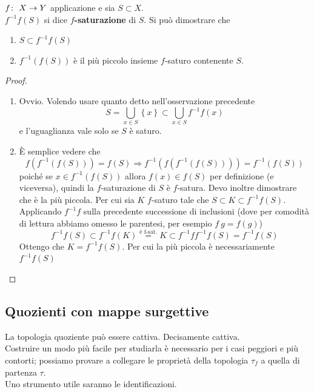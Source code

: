 \begin{theorem}
	$f \colon\ X \rightarrow Y$ applicazione e sia $S \subset X$. \\ $f^{-1}f(S)$ si dice \textbf{$f$-saturazione} di $S$. Si può dimostrare che 
	\begin{enumerate}
		\item $S \subset f^{-1}f(S)$
		\item $f^{-1}\left(f(S)\right)$ è il più piccolo insieme $f$-saturo contenente $S$.
	\end{enumerate}
\end{theorem}
\begin{proof}\
	\begin{enumerate}
		\item Ovvio. Volendo usare quanto detto nell'osservazione precedente
		\begin{equation*}
			S = \bigcup_{x\in S} \left\{x\right\} \subset \bigcup_{x \in S} f^{-1}f(x)
		\end{equation*}
		e l'uguaglianza vale solo se $S$ è saturo.
		\item È semplice vedere che
		\begin{equation*}
			f(f^{-1}(f(S))) = f(S) \Longrightarrow f^{-1}(f(f^{-1}(f(S)))) = f^{-1}(f(S))
		\end{equation*}
		poiché se $x \in f^{-1}(f(S))$ allora $f(x) \in f(S)$ per definizione (e viceversa), quindi la $f$-saturazione di $S$ è $f$-satura. Devo inoltre dimostrare che è la più piccola. Per cui sia $K$ $f$-saturo tale che $S \subset K \subset f^{-1}f(S)$. Applicando $f^{-1}f$ sulla precedente successione di inclusioni (dove per comodità di lettura abbiamo omesso le parentesi, per esempio $f \ g = f(g)$)
		\begin{equation*}
			f^{-1}f(S) \subset f^{-1}f(K) \overset{\text{è f-sat.}}{=} K \subset f^{-1}ff^{-1}f(S) = f^{-1}f(S) 
		\end{equation*}
		Ottengo che $K = f^{-1}f(S)$. Per cui la più piccola è necessariamente $f^{-1}f(S)$ 
	\end{enumerate}
\end{proof}

\subsection{\textcolor{TopGener}{\textbf{Quozienti con mappe surgettive}}}
La topologia quoziente può essere cattiva. Decisamente cattiva. \\
Costruire un modo più facile per studiarla è necessario per i casi peggiori e più contorti; possiamo provare a collegare le proprietà della topologia $\tau_f$ a quella di partenza $\tau$. \\ Uno strumento utile saranno le identificazioni.

